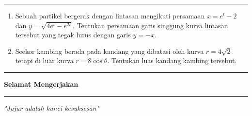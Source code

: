 \documentclass[10pt,openany,a4paper]{article}
\theoremstyle{definition}
\theoremstyle{definition}
\theoremstyle{plain}
\begin{document}
    \noindent\rule{\textwidth}{2.pt}
\begin{enumerate}
     
    \item Sebuah partikel bergerak dengan lintasan mengikuti persamaan $x=e^t-2$ dan $y=\sqrt{4e^t-e^{2t}}$. Tentukan persamaan garis singgung kurva lintasan tersebut yang tegak lurus dengan garis $y=-x$.
    
    
    \item Seekor kambing berada pada kandang yang dibatasi oleh kurva $r=4\sqrt{2}$ tetapi di luar kurva $r=8\cos\theta$. Tentukan luas kandang kambing tersebut.
\end{enumerate}
\begin{center}
    \noindent\rule{0.366416\linewidth}{2pt} \textbf{ Selamat Mengerjakan } \rule{0.366416\linewidth}{2pt}
\end{center}
\begin{center}
    \textit{"Jujur adalah kunci kesuksesan"}
\end{center}
\end{document}
